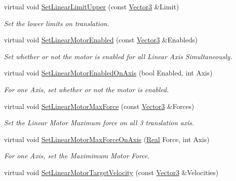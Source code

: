 \begin{DoxyCompactItemize}
virtual void \hyperlink{classphys_1_1Generic6DofConstraint_a55f3d23d2892d09557dfbabf06253745}{SetLinearLimitUpper} (const \hyperlink{classphys_1_1Vector3}{Vector3} \&Limit)
\begin{DoxyCompactList}\small\item\em Set the lower limits on translation. \item\end{DoxyCompactList}\item 
virtual void \hyperlink{classphys_1_1Generic6DofConstraint_a36f596d27cd10f350dd560d908246629}{SetLinearMotorEnabled} (const \hyperlink{classphys_1_1Vector3}{Vector3} \&Enableds)
\begin{DoxyCompactList}\small\item\em Set whether or not the motor is enabled for all Linear Axis Simultaneously. \item\end{DoxyCompactList}\item 
virtual void \hyperlink{classphys_1_1Generic6DofConstraint_a166625de5d0556fe0643a265ea8a02ef}{SetLinearMotorEnabledOnAxis} (bool Enabled, int Axis)
\begin{DoxyCompactList}\small\item\em For one Axis, set whether or not the motor is enabled. \item\end{DoxyCompactList}\item 
virtual void \hyperlink{classphys_1_1Generic6DofConstraint_aa9f021e716bc9f72d7c7d414427dea7d}{SetLinearMotorMaxForce} (const \hyperlink{classphys_1_1Vector3}{Vector3} \&Forces)
\begin{DoxyCompactList}\small\item\em Set the Linear Motor Maximum force on all 3 translation axis. \item\end{DoxyCompactList}\item 
virtual void \hyperlink{classphys_1_1Generic6DofConstraint_ae54e4fa97b637636ed7bcace15ce8693}{SetLinearMotorMaxForceOnAxis} (\hyperlink{namespacephys_af7eb897198d265b8e868f45240230d5f}{Real} Force, int Axis)
\begin{DoxyCompactList}\small\item\em For one Axis, set the Maximimum Motor Force. \item\end{DoxyCompactList}\item 
virtual void \hyperlink{classphys_1_1Generic6DofConstraint_a06f6ab25155bcdf64410c291bbcc0206}{SetLinearMotorTargetVelocity} (const \hyperlink{classphys_1_1Vector3}{Vector3} \&Velocities)

\end{DoxyCompactItemize}
